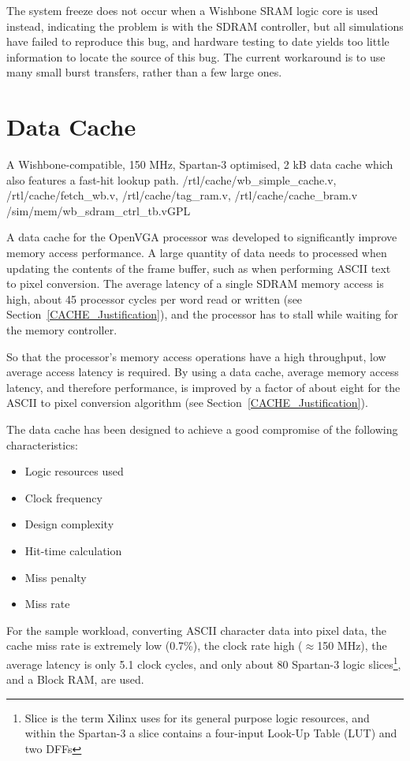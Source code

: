 The system freeze does not occur when a Wishbone SRAM logic core is used instead,
indicating the problem is with the SDRAM controller, but all simulations have
failed to reproduce this bug, and hardware testing to date yields too little
information to locate the source of this bug. The current workaround is to use
many small burst transfers, rather than a few large ones.


\section{Data Cache}
\label{MEM_Cache}

{A Wishbone-compatible, 150 MHz, Spartan-3 optimised, 2 kB data cache which also
features a fast-hit lookup path.} {/rtl/cache/wb\_simple\_cache.v,
/rtl/cache/fetch\_wb.v, /rtl/cache/tag\_ram.v, /rtl/cache/cache\_bram.v}
{/sim/mem/wb\_sdram\_ctrl\_tb.v}{GPL}

A data cache for the OpenVGA processor was developed to significantly improve
memory access performance. A large quantity of data needs to processed when
updating the contents of the frame buffer, such as when performing ASCII text to
pixel conversion. The average latency of a single SDRAM memory access is high,
about 45 processor cycles per word read or written (see
Section~\ref{CACHE_Justification}), and the processor has to stall while waiting
for the memory controller.

So that the processor's memory access operations have a high throughput, low
average access latency is required. By using a data cache, average memory access
latency, and therefore performance, is improved by a factor of about eight for
the ASCII to pixel conversion algorithm (see Section~\ref{CACHE_Justification}).

The data cache has been designed to achieve a good compromise of the following
characteristics:
\begin{itemize}
  \item Logic resources used
  \item Clock frequency
  \item Design complexity
  \item Hit-time calculation
  \item Miss penalty
  \item Miss rate
\end{itemize}

For the sample workload, converting ASCII character data into pixel data, the
cache miss rate is extremely low (0.7\%), the clock rate high ($\approx$150
MHz), the average latency is only 5.1 clock cycles, and only about 80 Spartan-3
logic slices\footnote{Slice is the term Xilinx uses for its general purpose logic
resources, and within the Spartan-3 a slice contains a four-input Look-Up
Table (LUT) and two DFFs}, and
a Block RAM, are used.


